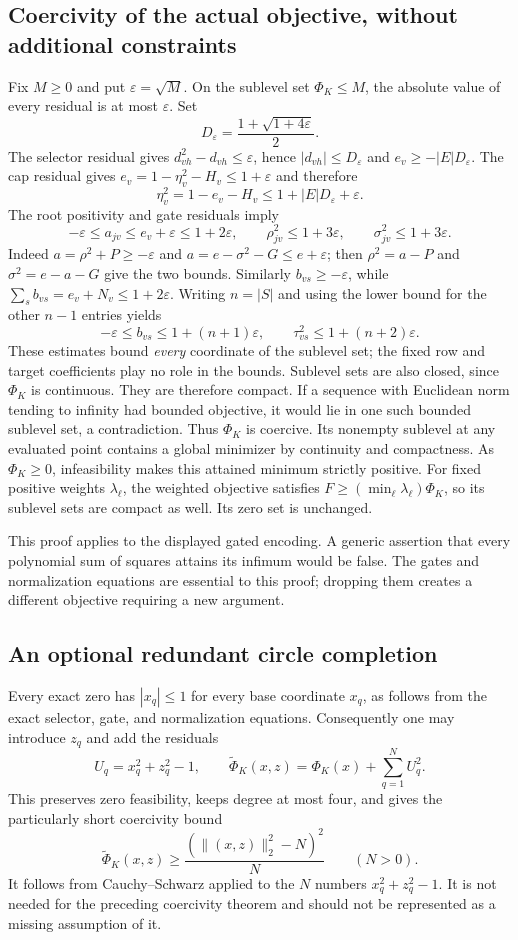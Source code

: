 \documentclass[11pt]{article}
\theoremstyle{remark}
\begin{document}
\subsection{Coercivity of the actual objective, without additional constraints}
\label{sec:budget-coercivity}
Fix $M\ge0$ and put $\varepsilon=\sqrt M$. On the sublevel set
$\Phi_K\le M$, the absolute value of every residual is at most
$\varepsilon$. Set
\[
 D_\varepsilon=\frac{1+\sqrt{1+4\varepsilon}}2.
\]
The selector residual gives $d_{vh}^2-d_{vh}\le\varepsilon$, hence
$|d_{vh}|\le D_\varepsilon$ and $e_v\ge-|E|D_\varepsilon$.
The cap residual gives
$e_v=1-\eta_v^2-H_v\le1+\varepsilon$ and therefore
\[
 \eta_v^2=1-e_v-H_v\le1+|E|D_\varepsilon+\varepsilon.
\]
The root positivity and gate residuals imply
\[
 -\varepsilon\le a_{jv}\le e_v+\varepsilon\le1+2\varepsilon,
 \qquad
 \rho_{jv}^2\le1+3\varepsilon,
 \qquad
 \sigma_{jv}^2\le1+3\varepsilon.
\]
Indeed $a=\rho^2+P\ge-\varepsilon$ and
$a=e-\sigma^2-G\le e+\varepsilon$; then
$\rho^2=a-P$ and $\sigma^2=e-a-G$ give the two bounds.
Similarly $b_{vs}\ge-\varepsilon$, while
$\sum_sb_{vs}=e_v+N_v\le1+2\varepsilon$. Writing $n=|S|$ and using the
lower bound for the other $n-1$ entries yields
\[
 -\varepsilon\le b_{vs}\le1+(n+1)\varepsilon,
 \qquad
 \tau_{vs}^2\le1+(n+2)\varepsilon.
\]
These estimates bound \emph{every} coordinate of the sublevel set; the
fixed row and target coefficients play no role in the bounds. Sublevel sets
are also closed, since $\Phi_K$ is continuous. They are therefore compact.
If a sequence with Euclidean norm tending to infinity had bounded objective,
it would lie in one such bounded sublevel set, a contradiction. Thus
$\Phi_K$ is coercive. Its nonempty sublevel at any evaluated point contains
a global minimizer by continuity and compactness. As $\Phi_K\ge0$,
infeasibility makes this attained minimum strictly positive.
For fixed positive weights $\lambda_\ell$, the weighted objective satisfies
$F\ge(\min_\ell\lambda_\ell)\Phi_K$, so its sublevel sets are compact as well.
Its zero set is unchanged.

This proof applies to the displayed gated encoding. A generic assertion
that every polynomial sum of squares attains its infimum would be false.
The gates and normalization equations are essential to this proof; dropping
them creates a different objective requiring a new argument.

\subsection{An optional redundant circle completion}
Every exact zero has $|x_q|\le1$ for every base coordinate $x_q$, as follows
from the exact selector, gate, and normalization equations. Consequently
one may introduce $z_q$ and add the residuals
\[
 U_q=x_q^2+z_q^2-1,\qquad
 \widetilde\Phi_K(x,z)=\Phi_K(x)+\sum_{q=1}^NU_q^2.
\]
This preserves zero feasibility, keeps degree at most four, and gives the
particularly short coercivity bound
\[
 \widetilde\Phi_K(x,z)
 \ge\frac{(\|(x,z)\|_2^2-N)^2}{N}\qquad(N>0).
\]
It follows from Cauchy--Schwarz applied to the $N$ numbers
$x_q^2+z_q^2-1$. It is not needed for the preceding coercivity theorem and
should not be represented as a missing assumption of it.
\end{document}
